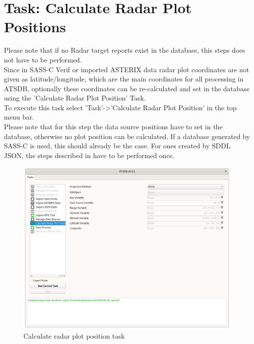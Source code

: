 \section{Task: Calculate Radar Plot Positions}
\label{sec:task_calc_radar_pos}

Please note that if no Radar target reports exist in the database, this steps does not have to be performed.\\

Since in SASS-C Verif or imported ASTERIX data radar plot coordinates are not given as latitude/longitude, which are the main coordinates for all processing in ATSDB, optionally these coordinates can be re-calculated and set in the database using the 'Calculate Radar Plot Position' Task. \\

To execute this task select 'Task'->'Calculate Radar Plot Position' in the top menu bar. \\

Please note that for this step the data source positions have to set in the database, otherwise no plot position can be calculated. If a database generated by SASS-C is used, this should already be the case. For ones created by SDDL JSON, the steps described in  have to be performed once.

\begin{figure}[H]
  \center
    \includegraphics[width=14cm,frame]{../screenshots/task_calc_radar.png}
  \caption{Calculate radar plot position task}
  \label{fig:task_calc_radar}
\end{figure}

